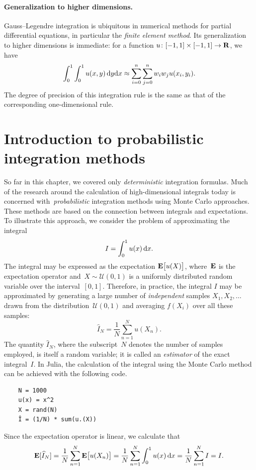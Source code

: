 \paragraph{Generalization to higher dimensions.}
Gauss--Legendre integration is ubiquitous in numerical methods for partial differential equations,
in particular the \emph{finite element method}.
Its generalization to higher dimensions is immediate:
for a function $u\colon [-1, 1] \times [-1, 1] \to \mathbf R$,
we have
\[
    \int_{0}^{1} \int_{0}^{1} u(x, y) \, \mathrm d y \mathrm d x \approx \sum_{i=0}^{n} \sum_{j=0}^{n} w_i w_j u(x_i, y_i).
\]
The degree of precision of this integration rule is the same as
that of the corresponding one-dimensional rule.

\section{Introduction to probabilistic integration methods}
So far in this chapter,
we covered only \emph{deterministic} integration formulas.
Much of the research around the calculation of high-dimensional integrals today is concerned with~\emph{probabilistic} integration methods using Monte Carlo approaches.
These methods are based on the connection between integrals and expectations.
To illustrate this approach, we consider the problem of approximating the integral
\[
    I = \int_{0}^{1} u(x) \, \mathrm d x.
\]
The integral may be expressed as the expectation $\mathbf E \bigl[u(X)\bigr]$,
where~$\mathbf E$ is the expectation operator and~$X \sim \mathcal U(0, 1)$ is a uniformly distributed random variable over the interval~$[0, 1]$.
Therefore, in practice,
the integral $I$ may be approximated by generating a large number of \emph{independent} samples $X_1, X_2,\dotsc$ drawn from the distribution~$\mathcal U(0, 1)$
and averaging $f(X_i)$ over all these samples:
\[
    \widehat I_N = \frac{1}{N} \sum_{n=1}^{N} u(X_n).
\]
The quantity $\widehat I_N$,
where the subscript~$N$ denotes the number of samples employed,
is itself a random variable;
it is called an \emph{estimator} of the exact integral~$I$.
In Julia, the calculation of the integral using the Monte Carlo method can be achieved with the following code.
\begin{verbatim}
    N = 1000
    u(x) = x^2
    X = rand(N)
    Î = (1/N) * sum(u.(X))
\end{verbatim}
Since the expectation operator is linear,
we calculate that
\[
    \mathbf E[\widehat I_N] = \frac{1}{N} \sum_{n=1}^{N} \mathbf E \bigl[u(X_n)\bigr] = \frac{1}{N} \sum_{n=1}^{N} \int_{0}^{1} u(x) \, \mathrm d x = \frac{1}{N} \sum_{n=1}^{N} I = I.
\]
